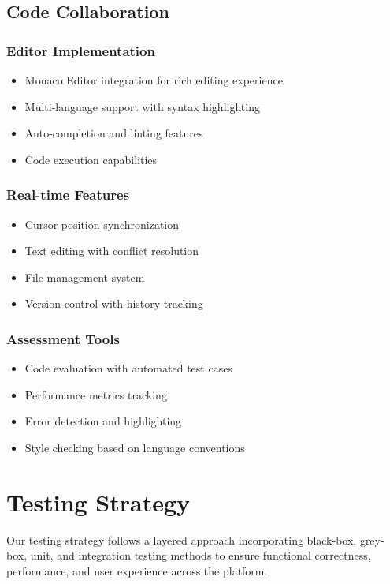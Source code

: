 \documentclass[12pt,a4paper]{report}
\begin{document}
\subsection{Code Collaboration}
\subsubsection{Editor Implementation}
\begin{itemize}
   \item Monaco Editor integration for rich editing experience
   \item Multi-language support with syntax highlighting
   \item Auto-completion and linting features
   \item Code execution capabilities
\end{itemize}

\subsubsection{Real-time Features}
\begin{itemize}
   \item Cursor position synchronization
   \item Text editing with conflict resolution
   \item File management system
   \item Version control with history tracking
\end{itemize}

\subsubsection{Assessment Tools}
\begin{itemize}
   \item Code evaluation with automated test cases
   \item Performance metrics tracking
   \item Error detection and highlighting
   \item Style checking based on language conventions
\end{itemize}
\section{Testing Strategy}

Our testing strategy follows a layered approach incorporating black-box, grey-box, unit, and integration testing methods to ensure functional correctness, performance, and user experience across the platform.
\end{document}
